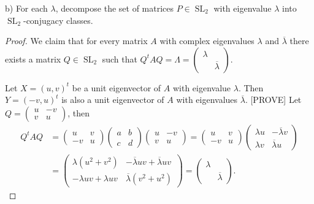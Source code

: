 \documentclass{article}
\theoremstyle{definition}
\newcommand{\SL}{\operatorname{SL}}
\begin{document}
\begin{tcolorbox}
b) For each $\lambda$, decompose the set of matrices $P \in \SL_2$ with eigenvalue $\lambda$ into $\SL_2$-conjugacy classes.
\end{tcolorbox}

\begin{proof}

We claim that for every matrix $A$ with complex eigenvalues $\lambda$ and $\overline{\lambda}$ there exists a matrix $Q \in \SL_2$ such that 
$Q^t A Q = \Lambda = \begin{pmatrix} \lambda & \\ & \overline{\lambda} \end{pmatrix}$.

Let $X = (u, v)^t$ be a unit eigenvector of $A$ with eigenvalue $\lambda$.
Then $Y = (-v,u)^t$ is also a unit eigenvector of $A$ with eigenvalues $\overline{\lambda}$. [PROVE]
Let 
$
    Q =
    \begin{pmatrix}
        u & -v \\
        v & u
    \end{pmatrix}
$, then
\begin{align*}
    Q^t A Q & = 
    \begin{pmatrix}
        u & v \\
        -v & u
    \end{pmatrix}
    \begin{pmatrix}
        a & b \\
        c & d
    \end{pmatrix}
    \begin{pmatrix}
        u & -v \\
        v & u
    \end{pmatrix}
    =
    \begin{pmatrix}
        u & v \\
        -v & u
    \end{pmatrix}
    \begin{pmatrix}
        \lambda u & -\overline{\lambda} v \\
        \lambda v & \overline{\lambda} u
    \end{pmatrix}
    \\
    & = 
    \begin{pmatrix}
        \lambda(u^2+v^2) & - \overline{\lambda} uv + \overline{\lambda} uv \\
        - \lambda uv + \lambda uv & \overline{\lambda} (v^2 + u^2)
    \end{pmatrix}
    = 
    \begin{pmatrix}
        \lambda &  \\
         & \overline{\lambda}
    \end{pmatrix}.
\end{align*}


\end{proof}
\end{document}

